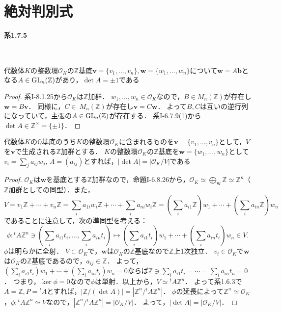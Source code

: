 \setcounter{section}{6}
\section{絶対判別式}
\paragraph{系1.7.5}~
\begin{screen}
  代数体$K$の整数環$\mathcal{O}_K$の$\mathbb{Z}$基底$\boldsymbol{v} = \{v_1, \ldots, v_n\}, \boldsymbol{w} = \{w_1, \ldots, w_n\}$について$\boldsymbol{w} = A\boldsymbol{b}$となる$A\in\operatorname{GL}_n(\mathbb{Z})$があり，$\det{A} = \pm 1$である
\end{screen}
\begin{proof}
  系I-8.1.25から$\mathcal{O}_K$は$\mathbb{Z}$加群．
  $w_1, \ldots, w_n\in\mathcal{O}_K$なので，$B\in M_n(\mathbb{Z})$が存在し$\boldsymbol{w} = B\boldsymbol{v}$．
  同様に，$C\in\ M_n(\mathbb{Z})$が存在し$\boldsymbol{v} = C\boldsymbol{w}$．
  よって$B, C$は互いの逆行列になっていて，主張の$A\in\operatorname{GL}_n(\mathbb{Z})$が存在する．
  系I-6.7.9(1)から$\det A\in\mathbb{Z}^\times = \{\pm 1\}$．
\end{proof}

\begin{screen}
  代数体$K$の$\mathbb{Q}$基底のうち$K$の整数環$\mathcal{O}_K$に含まれるものを$\boldsymbol{v} = \{v_1, \ldots, v_n\}$として，$V$を$\boldsymbol{v}$で生成される$\mathbb{Z}$加群とする．
  $K$の整数環$\mathcal{O}_K$の$\mathbb{Z}$基底を$\boldsymbol{w} = \{w_1, \ldots, w_n\}$として$v_i = \sum_ja_{ij}w_j$, $A = (a_{ij})$とすれば，$|\det A| = |\mathcal{O}_K/V|$である
\end{screen}
\begin{proof}
  $\mathcal{O}_K$は$\boldsymbol{w}$を基底とする$\mathbb{Z}$加群なので，命題I-6.8.26から，$\mathcal{O}_K\simeq\bigoplus_{\boldsymbol{w}}\mathbb{Z}\simeq\mathbb{Z}^n$（$\mathbb{Z}$加群としての同型）．また，
  \[V = v_1\mathbb{Z} + \cdots + v_n\mathbb{Z} = \sum_ia_{1i}w_i\mathbb{Z} + \cdots + \sum_ia_{ni}w_i\mathbb{Z} = \left(\sum_ia_{i1}\mathbb{Z}\right)w_1 + \cdots + \left(\sum_ia_{in}\mathbb{Z}\right)w_n\]
  であることに注意して，次の準同型を考える：
  \[\phi\colon {}^tA\mathbb{Z}^n \ni \left(\sum_ia_{i1}t_i, \ldots, \sum_ia_{in}t_i\right) \mapsto \left(\sum_ia_{i1}t_i\right)w_1 + \cdots + \left(\sum_ia_{in}t_i\right)w_n \in V.\]
  $\phi$は明らかに全射．
  $V\subset\mathcal{O}_K$で，$\boldsymbol{w}$は$\mathcal{O}_K$の$\mathbb{Z}$基底なので$\mathbb{Z}$上1次独立．
  $v_i\in\mathcal{O}_K$で$\boldsymbol{w}$は$\mathcal{O}_K$の$\mathbb{Z}$基底であるので，$a_{ij}\in\mathbb{Z}$．
  よって，$(\sum_ia_{i1}t_i)w_1 + \cdots + (\sum_ia_{in}t_i)w_n = 0$ならば$\mathbb{Z}\ni\sum_ia_{i1}t_i = \cdots = \sum_ia_{in}t_n = 0$．
  つまり，$\ker\phi = 0$なので$\phi$は単射．以上から，$V\simeq{}^tA\mathbb{Z}^n$．
  よって系1.6.3で$A = \mathbb{Z}, P = {}^tA$とすれば，$|\mathbb{Z}/(\det A)| = |\mathbb{Z}^n/{}^tA\mathbb{Z}^n|$．
  $\phi$の延長によって$\mathbb{Z}^n\simeq\mathcal{O}_K$，$\phi\colon{}^tA\mathbb{Z}^n\simeq V$なので，$|\mathbb{Z}^n/{}^tA\mathbb{Z}^n| = |\mathcal{O}_K/V|$．
  よって，$|\det A| = |\mathcal{O}_K/V|$．
\end{proof}

